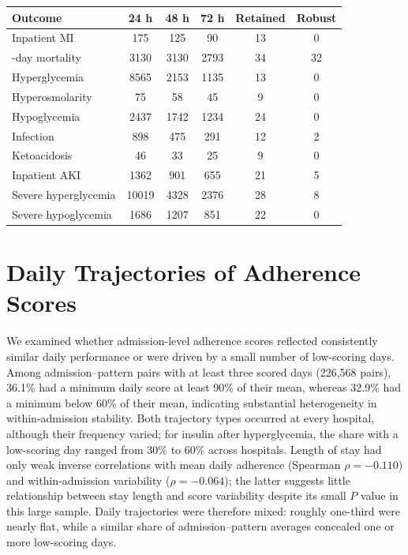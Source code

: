 \documentclass[11pt,a4paper]{article}
\begin{document}
\begin{center}
\label{tab:firth-summary}
\begin{tabularx}{\textwidth}{
>{\raggedright\arraybackslash}X
ccccc
}
\toprule
Outcome & 24 h & 48 h & 72 h & Retained & Robust \\
\midrule
Inpatient MI         & 175   & 125  & 90   & 13 & 0 \\
30-day mortality     & 3130  & 3130 & 2793 & 34 & 32 \\
Hyperglycemia        & 8565  & 2153 & 1135 & 13 & 0 \\
Hyperosmolarity      & 75    & 58   & 45   & 9  & 0 \\
Hypoglycemia         & 2437  & 1742 & 1234 & 24 & 0 \\
Infection            & 898   & 475  & 291  & 12 & 2 \\
Ketoacidosis         & 46    & 33   & 25   & 9  & 0 \\
Inpatient AKI        & 1362  & 901  & 655  & 21 & 5 \\
Severe hyperglycemia & 10019 & 4328 & 2376 & 28 & 8 \\
Severe hypoglycemia  & 1686  & 1207 & 851  & 22 & 0 \\
\bottomrule
\end{tabularx}
\end{center}

\section{Daily Trajectories of Adherence Scores}

We examined whether admission-level adherence scores reflected consistently
similar daily performance or were driven by a small number of low-scoring days.
Among admission--pattern pairs with at least three scored days (226,568 pairs),
36.1\% had a minimum daily score at least 90\% of their mean, whereas 32.9\%
had a minimum below 60\% of their mean, indicating substantial heterogeneity
in within-admission stability. Both trajectory types occurred at every
hospital, although their frequency varied; for insulin after hyperglycemia,
the share with a low-scoring day ranged from 30\% to 60\% across hospitals.
Length of stay had only weak inverse correlations with mean daily adherence
(Spearman $\rho=-0.110$) and within-admission variability
($\rho=-0.064$); the latter suggests little relationship between stay length
and score variability despite its small $P$ value in this large sample. Daily
trajectories were therefore mixed: roughly one-third were nearly flat, while a
similar share of admission--pattern averages concealed one or more low-scoring
days.




\end{document}
